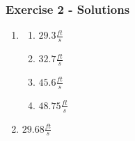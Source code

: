 \documentclass[12pt]{beamer}
\begin{document}
\begin{frame}
	\frametitle{Exercise 2 - Solutions}
	\vspace*{\fill}
	\vspace*{\fill}
	\begin{enumerate}
		\item
		      \begin{multicols}{4}
			      \begin{enumerate}
				      \item $29.3\tfrac{ft}{s}$
				      \item $32.7\tfrac{ft}{s}$
				      \item $45.6\tfrac{ft}{s}$
				      \item $48.75\tfrac{ft}{s}$
			      \end{enumerate}
		      \end{multicols}
		      \vspace*{\fill}
		\item $29.68\tfrac{ft}{s}$
	\end{enumerate}
	\vspace*{\fill}
	\vspace*{\fill}
	\vspace*{\fill}
	\vspace*{\fill}
\end{frame}
\end{document}
